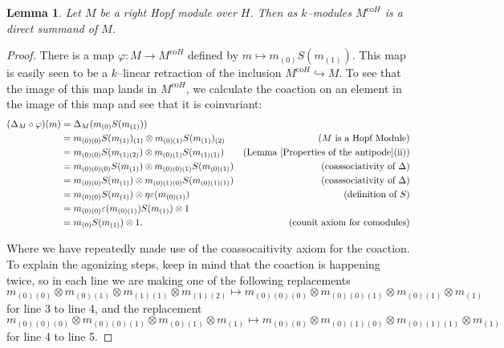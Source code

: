 \documentclass{article}
\theoremstyle{plain}
\newtheorem{Lemma}[Th]{Lemma}
\theoremstyle{definition}
\begin{document}
\begin{Lemma}\label{summand}
    Let $M$ be a right Hopf module over $H$. Then as $k$--modules $M^{\text{co}H}$ is a direct summand of $M$.
\end{Lemma}
 \begin{proof}
There is a map $\varphi: M\to M^{\text{co}H}$ defined by $m\mapsto  m_{(0)}S(m_{(1)})$. This map is easily seen to be a $k$--linear retraction of the inclusion $M^{\text{co}H}\hookrightarrow M$.  To see that the image of this map lands in $M^{\text{co}H}$, we calculate the coaction on an element in the image of this map and see that it is coinvariant:
\begin{align*}
    (\Delta_M \circ \varphi)(m)&= \Delta_M(m_{(0)}S(m_{(1)})) \\
    &=m_{(0)(0)}S(m_{(1)})_{(1)} \otimes m_{(0)(1)}S(m_{(1)})_{(2)} &\text{($M$ is a Hopf Module)}\\ 
    &=m_{(0)(0)}S(m_{(1)(2)}) \otimes m_{(0)(1)}S(m_{(1)(1)}) &\text{(Lemma \ref{Properties of the antipode}(ii))}\\
    &=m_{(0)(0)(0)}S(m_{(1)})\otimes m_{(0)(0)(1)}S(m_{(0)(1)}) &\text{(coassociativity of $\Delta$)} \\
    &=m_{(0)(0)}S(m_{(1)}) \otimes m_{(0)(1)(0)}S(m_{(0)(1)(1)}) &\text{(coassociativity of $\Delta$)}\\
    &=m_{(0)(0)}S(m_{(1)}) \otimes \eta \varepsilon(m_{(0)(1)}) &\text{(definition of $S$)}\\
    &=m_{(0)(0)}\varepsilon(m_{(0)(1)}) S(m_{(1)}) \otimes 1 \\
    &=m_{(0)}S(m_{(1)}) \otimes 1. &\text{(counit axiom for comodules)}
\end{align*}

Where we have repeatedly made use of the coassocaitivity axiom for the coaction. To explain the agonizing steps, keep in mind that the coaction is happening twice, so in each line we are making one of the following replacements 
\begin{equation*}
    m_{(0)(0)}\otimes m_{(0)(1)} \otimes m_{(1)(1)} \otimes m_{(1)(2)} \mapsto m_{(0)(0)(0)}\otimes m_{(0)(0)(1)} \otimes m_{(0)(1)} \otimes m_{(1)}
\end{equation*}
for line 3 to line 4, and the replacement 
\begin{equation*}    
m_{(0)(0)(0)}\otimes m_{(0)(0)(1)} \otimes m_{(0)(1)} \otimes m_{(1)} \mapsto m_{(0)(0)}\otimes m_{(0)(1)(0)} \otimes m_{(0)(1)(1)} \otimes m_{(1)}
\end{equation*}
for line 4 to line 5.
 \end{proof}
\end{document}
